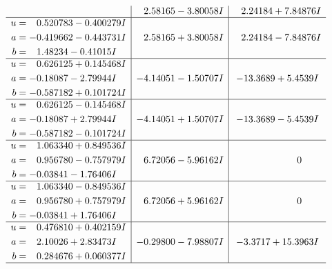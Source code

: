 \documentclass[1p]{elsarticle_modified}
\theoremstyle{definition}
\begin{document}
$$\begin{array}{c|c|c}
 & \phantom{-}2.58165 - 3.80058 I & \phantom{-}2.24184 + 7.84876 I \\ \hline\begin{aligned}
u &= \phantom{-}0.520783 - 0.400279 I \\
a &= -0.419662 - 0.443731 I \\
b &= \phantom{-}1.48234 - 0.41015 I\end{aligned}
 & \phantom{-}2.58165 + 3.80058 I & \phantom{-}2.24184 - 7.84876 I \\ \hline\begin{aligned}
u &= \phantom{-}0.626125 + 0.145468 I \\
a &= -0.18087 - 2.79944 I \\
b &= -0.587182 + 0.101724 I\end{aligned}
 & -4.14051 - 1.50707 I & -13.3689 + 5.4539 I \\ \hline\begin{aligned}
u &= \phantom{-}0.626125 - 0.145468 I \\
a &= -0.18087 + 2.79944 I \\
b &= -0.587182 - 0.101724 I\end{aligned}
 & -4.14051 + 1.50707 I & -13.3689 - 5.4539 I \\ \hline\begin{aligned}
u &= \phantom{-}1.063340 + 0.849536 I \\
a &= \phantom{-}0.956780 - 0.757979 I \\
b &= -0.03841 - 1.76406 I\end{aligned}
 & \phantom{-}6.72056 - 5.96162 I & \phantom{-0.000000 } 0 \\ \hline\begin{aligned}
u &= \phantom{-}1.063340 - 0.849536 I \\
a &= \phantom{-}0.956780 + 0.757979 I \\
b &= -0.03841 + 1.76406 I\end{aligned}
 & \phantom{-}6.72056 + 5.96162 I & \phantom{-0.000000 } 0 \\ \hline\begin{aligned}
u &= \phantom{-}0.476810 + 0.402159 I \\
a &= \phantom{-}2.10026 + 2.83473 I \\
b &= \phantom{-}0.284676 + 0.060377 I\end{aligned}
 & -0.29800 - 7.98807 I & -3.3717 + 15.3963 I\\
 \hline 
 \end{array}$$\newpage$$\begin{array}{c|c|c}  

\end{array}$$
\end{document}
